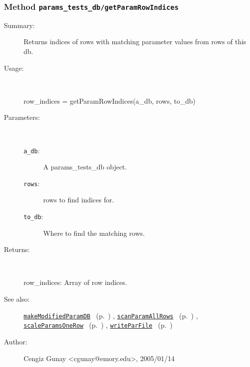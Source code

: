 \subsubsection[Method \texttt{getParamRowIndices}]{Method \texttt{params\_tests\_db/getParamRowIndices}}%
%
\label{ref_params_tests_db__getParamRowIndices}%
\hypertarget{ref_params_tests_db__getParamRowIndices}{}%
\begin{description}
\item[Summary:]Returns indices of rows with matching parameter values from rows of this db.
%
\item[Usage:]~%
\begin{lyxcode}%
row\_indices = getParamRowIndices(a\_db, rows, to\_db)
%
\end{lyxcode}%
%
%
\item[Parameters:]~
\begin{description}%
\item[\texttt{a\_db}:]
 A params\_tests\_db object.
\item[\texttt{rows}:]
 rows to find indices for.
\item[\texttt{to\_db}:]
 Where to find the matching rows.
\end{description}%
%
\item[Returns:
]~

	row\_indices: Array of row indices.
%
%
\item[See also:]%
\hyperlink{ref_makeModifiedParamDB}{\texttt{makeModifiedParamDB}}%
\ (p.~\pageref{ref_makeModifiedParamDB})%
%
, \hyperlink{ref_scanParamAllRows}{\texttt{scanParamAllRows}}%
\ (p.~\pageref{ref_scanParamAllRows})%
%
, \hyperlink{ref_scaleParamsOneRow}{\texttt{scaleParamsOneRow}}%
\ (p.~\pageref{ref_scaleParamsOneRow})%
%
, \hyperlink{ref_writeParFile}{\texttt{writeParFile}}%
\ (p.~\pageref{ref_writeParFile})%
%
%
\item[Author:]%
Cengiz Gunay <cgunay@emory.edu>, 2005/01/14
%
\end{description}
\methodline%

